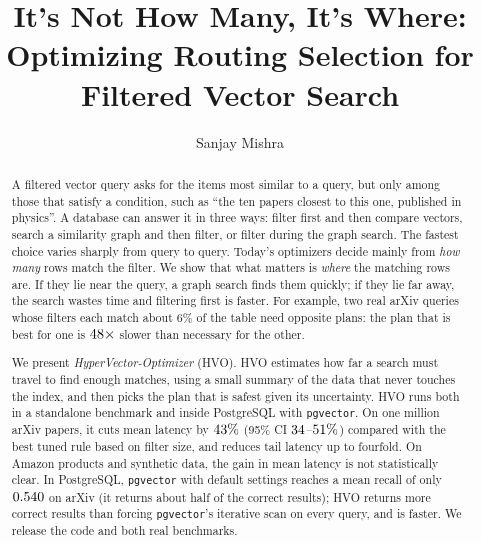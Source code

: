 \documentclass[sigconf, nonacm]{acmart}
\begin{document}
\title{It's Not How Many, It's Where: Optimizing Routing Selection for Filtered Vector Search}

\author{Sanjay Mishra}

\begin{abstract}
A filtered vector query asks for the items most similar to a query, but only among those that satisfy a condition, such as ``the ten papers closest to this one, published in physics''. A database can answer it in three ways: filter first and then compare vectors, search a similarity graph and then filter, or filter during the graph search. The fastest choice varies sharply from query to query. Today's optimizers decide mainly from \emph{how many} rows match the filter. We show that what matters is \emph{where} the matching rows are. If they lie near the query, a graph search finds them quickly; if they lie far away, the search wastes time and filtering first is faster. For example, two real arXiv queries whose filters each match about $6\%$ of the table need opposite plans: the plan that is best for one is $48\times$ slower than necessary for the other.

We present \emph{HyperVector-Optimizer} (HVO). HVO estimates how far a search must travel to find enough matches, using a small summary of the data that never touches the index, and then picks the plan that is safest given its uncertainty. HVO runs both in a standalone benchmark and inside PostgreSQL with \texttt{pgvector}. On one million arXiv papers, it cuts mean latency by $43\%$ (95\% CI $34$--$51\%$) compared with the best tuned rule based on filter size, and reduces tail latency up to fourfold. On Amazon products and synthetic data, the gain in mean latency is not statistically clear. In PostgreSQL, \texttt{pgvector} with default settings reaches a mean recall of only $0.540$ on arXiv (it returns about half of the correct results); HVO returns more correct results than forcing \texttt{pgvector}'s iterative scan on every query, and is faster. We release the code and both real benchmarks.
\end{abstract}

\maketitle

\vldbtopmatter
\end{document}
